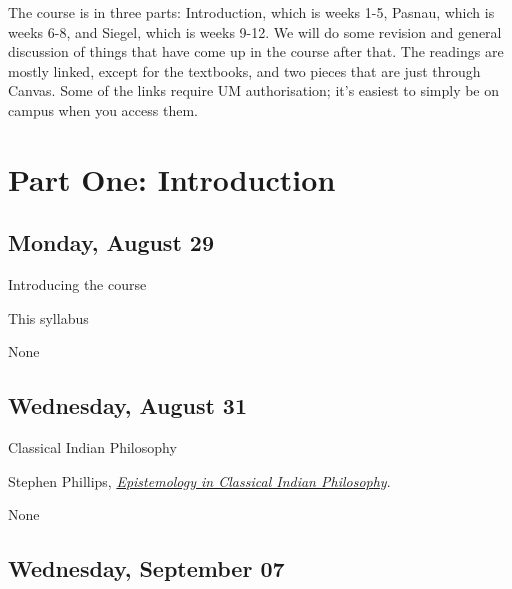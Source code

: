 \documentclass[
]{article}
\providecommand{\tightlist}{%
  \setlength{\itemsep}{0pt}\setlength{\parskip}{0pt}}\usepackage{longtable,booktabs,array}
\begin{document}
\newpage

The course is in three parts: Introduction, which is weeks 1-5, Pasnau,
which is weeks 6-8, and Siegel, which is weeks 9-12. We will do some
revision and general discussion of things that have come up in the
course after that. The readings are mostly linked, except for the
textbooks, and two pieces that are just through Canvas. Some of the
links require UM authorisation; it's easiest to simply be on campus when
you access them.

\hypertarget{part-one-introduction}{%
\section{Part One: Introduction}\label{part-one-introduction}}

\hypertarget{monday-august-29}{%
\subsection{Monday, August 29}\label{monday-august-29}}

\begin{description}
\tightlist
\item[Topic]
Introducing the course
\item[Required Reading]
This syllabus
\item[Suggested Reading]
None
\end{description}

\hypertarget{wednesday-august-31}{%
\subsection{Wednesday, August 31}\label{wednesday-august-31}}

\begin{description}
\tightlist
\item[Topic]
Classical Indian Philosophy
\item[Required Reading]
Stephen Phillips,
\href{Epistemology\%20in\%20Classical\%20Indian\%20Philosophy}{\emph{Epistemology
in Classical Indian Philosophy}}.
\item[Suggested Reading]
None
\end{description}

\hypertarget{wednesday-september-07}{%
\subsection{Wednesday, September 07}\label{wednesday-september-07}}
\end{document}
